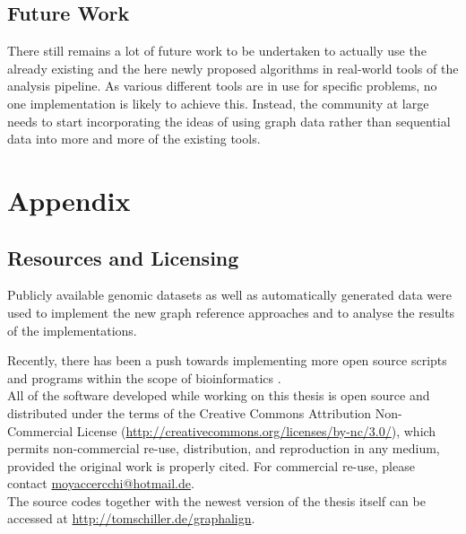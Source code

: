 \documentclass[a4paper,12pt,twoside,BCOR=10mm]{scrbook}
\begin{document}
\section{Future Work}

There still remains a lot of future work to be undertaken to actually use 
the already existing and the here newly proposed algorithms in real-world 
tools of the analysis pipeline. 
As various different tools are in use for specific problems, no one implementation 
is likely to achieve this. Instead, the community at large needs to start 
incorporating the ideas of using graph data rather than sequential data into 
more and more of the existing tools.



\appendix
\renewcommand{\chaptername}{Appendix}
\chapter{Appendix}
%

\section{Resources and Licensing}

Publicly available genomic datasets as well as automatically generated data were used 
to implement the new graph reference approaches and to analyse the results of the implementations.

Recently, there has been a push towards implementing more open source scripts 
and programs within the scope of bioinformatics \citep{MANIFESTO}. \\
All of the software developed while working on this thesis 
is open source and distributed under the terms of 
the Creative Commons Attribution Non-Commercial License 
(\url{http://creativecommons.org/licenses/by-nc/3.0/}), 
which permits non-commercial re-use, distribution, and reproduction in any medium, 
provided the original work is properly cited. 
For commercial re-use, please contact \url{moyaccercchi@hotmail.de}. \\
The source codes together with the newest version of the thesis itself can be accessed at \url{http://tomschiller.de/graphalign}.
% 

%
%
%
%
\end{document}
